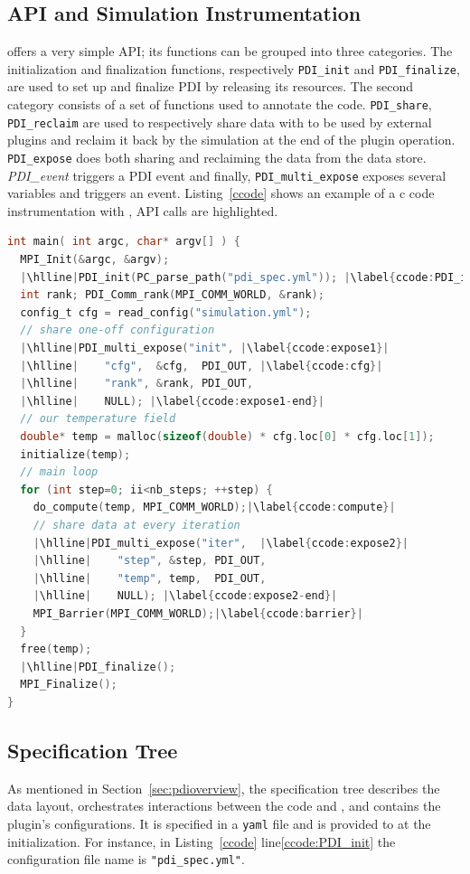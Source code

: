 \subsection{\pdi API and Simulation Instrumentation}
\pdi offers a very simple API; its functions can be grouped into three categories. The initialization and finalization functions, respectively \texttt{PDI\_init} and \texttt{PDI\_finalize}, are used to set up and finalize PDI by releasing its resources. 
The second category consists of a set of functions used to annotate the code. \texttt{PDI\_share}, \texttt{PDI\_reclaim} are used to respectively share data with \pdi to be used by external plugins and reclaim it back by the simulation at the end of the plugin operation. \texttt{PDI\_expose} does both sharing and reclaiming the data from the data store. \textit{PDI\_event} triggers a PDI event and finally, \texttt{PDI\_multi\_expose} exposes several variables and triggers an event. Listing~\ref{ccode} shows an example of a c code instrumentation with \pdi, \pdi API calls are highlighted.

\begin{lstlisting}[float=h, label=ccode, language=c, caption=\pdi instrumentation of the C simulation code]
int main( int argc, char* argv[] ) {
  MPI_Init(&argc, &argv);
  |\hlline|PDI_init(PC_parse_path("pdi_spec.yml")); |\label{ccode:PDI_init}|
  int rank; PDI_Comm_rank(MPI_COMM_WORLD, &rank);
  config_t cfg = read_config("simulation.yml");
  // share one-off configuration
  |\hlline|PDI_multi_expose("init", |\label{ccode:expose1}|
  |\hlline|    "cfg",  &cfg,  PDI_OUT, |\label{ccode:cfg}|
  |\hlline|    "rank", &rank, PDI_OUT,
  |\hlline|    NULL); |\label{ccode:expose1-end}|
  // our temperature field
  double* temp = malloc(sizeof(double) * cfg.loc[0] * cfg.loc[1]);
  initialize(temp);
  // main loop
  for (int step=0; ii<nb_steps; ++step) {
    do_compute(temp, MPI_COMM_WORLD);|\label{ccode:compute}|
    // share data at every iteration
    |\hlline|PDI_multi_expose("iter",  |\label{ccode:expose2}|
    |\hlline|    "step", &step, PDI_OUT,
    |\hlline|    "temp", temp,  PDI_OUT,
    |\hlline|    NULL); |\label{ccode:expose2-end}|
    MPI_Barrier(MPI_COMM_WORLD);|\label{ccode:barrier}|
  }
  free(temp);
  |\hlline|PDI_finalize();
  MPI_Finalize();
}
\end{lstlisting}

\subsection{\pdi Specification Tree}
As mentioned in Section~\ref{sec:pdioverview}, the specification tree describes the data layout, orchestrates interactions between the code and \pdi, and contains the plugin's configurations. It is specified in a \texttt{yaml} file and is provided to \pdi at the initialization. For instance, in Listing~\ref{ccode} line\ref{ccode:PDI_init} the configuration file name is \texttt{"pdi\_spec.yml"}. 

